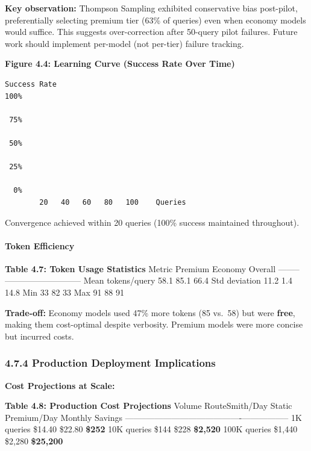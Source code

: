 \textbf{Key observation:} Thompson Sampling exhibited conservative bias
post-pilot, preferentially selecting premium tier (63\% of queries) even
when economy models would suffice. This suggests over-correction after
50-query pilot failures. Future work should implement per-model (not
per-tier) failure tracking.

\textbf{Figure 4.4: Learning Curve (Success Rate Over Time)}

\begin{verbatim}
Success Rate
100%                                        
      
 75%  
      
 50%  
      
 25%  
      
  0%                                          
        20   40   60   80   100    Queries
\end{verbatim}

Convergence achieved within 20 queries (100\% success maintained
throughout).

\hypertarget{token-efficiency-1}{%
\paragraph{Token Efficiency}\label{token-efficiency-1}}

\textbf{Table 4.7: Token Usage Statistics} \textbar{} Metric \textbar{}
Premium \textbar{} Economy \textbar{} Overall \textbar{}
\textbar--------\textbar---------\textbar---------\textbar---------\textbar{}
\textbar{} Mean tokens/query \textbar{} 58.1 \textbar{} 85.1 \textbar{}
66.4 \textbar{} \textbar{} Std deviation \textbar{} 11.2 \textbar{} 1.4
\textbar{} 14.8 \textbar{} \textbar{} Min \textbar{} 33 \textbar{} 82
\textbar{} 33 \textbar{} \textbar{} Max \textbar{} 91 \textbar{} 88
\textbar{} 91 \textbar{}

\textbf{Trade-off:} Economy models used 47\% more tokens (85 vs.~58) but
were \textbf{free}, making them cost-optimal despite verbosity. Premium
models were more concise but incurred costs.

\hypertarget{production-deployment-implications-1}{%
\subsubsection{4.7.4 Production Deployment
Implications}\label{production-deployment-implications-1}}

\textbf{Cost Projections at Scale:}

\textbf{Table 4.8: Production Cost Projections} \textbar{} Volume
\textbar{} RouteSmith/Day \textbar{} Static Premium/Day \textbar{}
Monthly Savings \textbar{}
\textbar--------\textbar---------------\textbar-------------------\textbar-----------------\textbar{}
\textbar{} 1K queries \textbar{} \$14.40 \textbar{} \$22.80 \textbar{}
\textbf{\$252} \textbar{} \textbar{} 10K queries \textbar{} \$144
\textbar{} \$228 \textbar{} \textbf{\$2,520} \textbar{} \textbar{} 100K
queries \textbar{} \$1,440 \textbar{} \$2,280 \textbar{}
\textbf{\$25,200} \textbar{}

